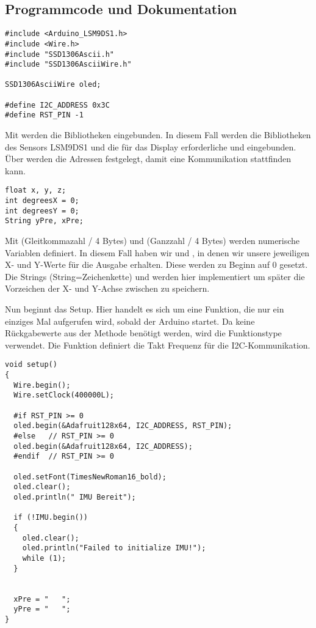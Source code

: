 \subsection{Programmcode und Dokumentation}

\begin{lstlisting}[language=Arduino]
#include <Arduino_LSM9DS1.h>
#include <Wire.h>
#include "SSD1306Ascii.h"
#include "SSD1306AsciiWire.h"
    
SSD1306AsciiWire oled;
    
#define I2C_ADDRESS 0x3C
#define RST_PIN -1
\end{lstlisting}



 Mit  werden die Bibliotheken eingebunden. In diesem Fall werden die Bibliotheken des  Sensors LSM9DS1 und die für das Display erforderliche  und  eingebunden. Über  werden die Adressen festgelegt, damit eine Kommunikation stattfinden kann. 



\begin{lstlisting}[language=Arduino]
float x, y, z;
int degreesX = 0;
int degreesY = 0;
String yPre, xPre;
\end{lstlisting}

Mit  (Gleitkommazahl / 4 Bytes) und  (Ganzzahl / 4 Bytes) werden numerische Variablen definiert. In diesem Fall haben wir  und , in denen wir unsere jeweiligen X- und Y-Werte für die Ausgabe erhalten. Diese werden zu Beginn auf 0 gesetzt. Die Strings (String=Zeichenkette)  und  werden hier implementiert um später die Vorzeichen der X- und Y-Achse zwischen zu speichern.


Nun beginnt das Setup. Hier handelt es sich um eine Funktion, die nur ein einziges Mal aufgerufen wird, sobald der Arduino startet. Da keine Rückgabewerte aus der Methode benötigt werden, wird die Funktionstype  verwendet. Die Funktion  definiert die Takt Frequenz für die I2C-Kommunikation. 

\begin{lstlisting}[language=Arduino]
void setup() 
{
  Wire.begin();
  Wire.setClock(400000L);
        
  #if RST_PIN >= 0
  oled.begin(&Adafruit128x64, I2C_ADDRESS, RST_PIN);
  #else   // RST_PIN >= 0
  oled.begin(&Adafruit128x64, I2C_ADDRESS);
  #endif  // RST_PIN >= 0      

  oled.setFont(TimesNewRoman16_bold);
  oled.clear();
  oled.println(" IMU Bereit");
        
  if (!IMU.begin()) 
  {
    oled.clear();
    oled.println("Failed to initialize IMU!");
    while (1);
  }
        
        
  xPre = "   ";
  yPre = "   ";
}
\end{lstlisting}

